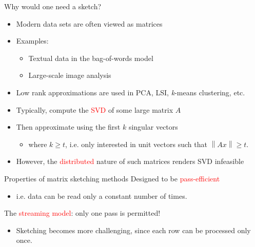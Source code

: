 \documentclass[first=dgreen,second=purple,logo=redque]{aaltoslides}
\newcommand{\vectornorm}[1]{\left\|#1\right\|}
\begin{document}
\begin{frame}[allowframebreaks=1]{Why would one need a sketch?}
\begin{itemize}
  \item Modern data sets are often viewed as \textcolor{dgreen}{matrices}
  \item{Examples:}
  \begin{itemize}
    \item Textual data in the bag-of-words model %
    \item Large-scale image analysis %
  \end{itemize}
  \item Low rank approximations are used in PCA, LSI, \textit{k}-means clustering, etc.


  \item Typically, compute the \textcolor{red}{SVD} of some large matrix $A$
  \item Then \textcolor{dgreen}{approximate} using the first $k$ singular vectors
  \begin{itemize}
     \item where $k \geq t$, i.e. only interested in unit vectors such
     that $\vectornorm{Ax} \geq t$.
  \end{itemize}
  \item However, the \textcolor{red}{distributed} nature of such matrices renders SVD \textcolor{dgreen}{infeasible}
\end{itemize}

\end{frame}




\begin{frame}{Properties of matrix sketching methods}
Designed to be \textcolor{red}{pass-efficient}
\begin{itemize}
\item i.e. data can be read only a \textcolor{dgreen}{constant} number of times.
\end{itemize}
The \textcolor{red}{streaming model}: \textcolor{dgreen}{only one} pass is permitted!
\begin{itemize}
\item Sketching becomes more challenging, since each row can be processed only
once. %
\end{itemize}

\end{frame}
\end{document}
